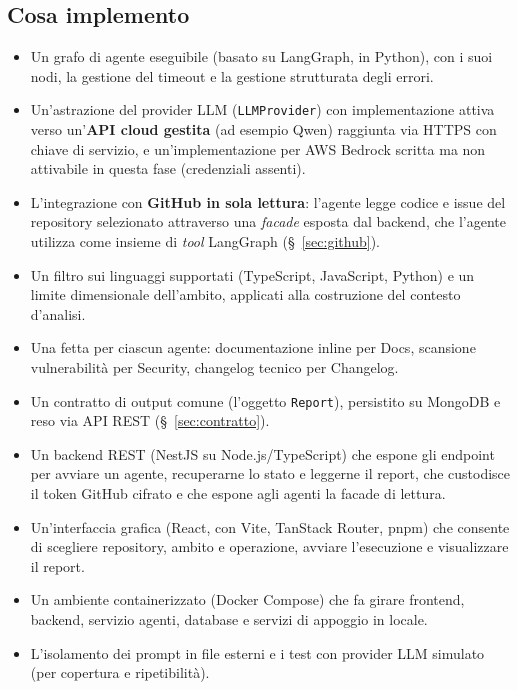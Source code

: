 \documentclass[11pt,a4paper]{article}
\begin{document}
\subsection{Cosa implemento}
\begin{itemize}
    \item Un grafo di agente eseguibile (basato su LangGraph, in Python), con i suoi nodi, la gestione del timeout e la gestione strutturata degli errori.
    \item Un'astrazione del provider LLM (\texttt{LLMProvider}) con implementazione attiva verso un'\textbf{API cloud gestita} (ad esempio Qwen) raggiunta via HTTPS con chiave di servizio, e un'implementazione per AWS Bedrock scritta ma non attivabile in questa fase (credenziali assenti).
    \item L'integrazione con \textbf{GitHub in sola lettura}: l'agente legge codice e issue del repository selezionato attraverso una \emph{facade} esposta dal backend, che l'agente utilizza come insieme di \emph{tool} LangGraph (\S~\ref{sec:github}).
    \item Un filtro sui linguaggi supportati (TypeScript, JavaScript, Python) e un limite dimensionale dell'ambito, applicati alla costruzione del contesto d'analisi.
    \item Una fetta per ciascun agente: documentazione inline per Docs, scansione vulnerabilità per Security, changelog tecnico per Changelog.
    \item Un contratto di output comune (l'oggetto \texttt{Report}), persistito su MongoDB e reso via API REST (\S~\ref{sec:contratto}).
    \item Un backend REST (NestJS su Node.js/TypeScript) che espone gli endpoint per avviare un agente, recuperarne lo stato e leggerne il report, che custodisce il token GitHub cifrato e che espone agli agenti la facade di lettura.
    \item Un'interfaccia grafica (React, con Vite, TanStack Router, pnpm) che consente di scegliere repository, ambito e operazione, avviare l'esecuzione e visualizzare il report.
    \item Un ambiente containerizzato (Docker Compose) che fa girare frontend, backend, servizio agenti, database e servizi di appoggio in locale.
    \item L'isolamento dei prompt in file esterni e i test con provider LLM simulato (per copertura e ripetibilità).
\end{itemize}
\end{document}
